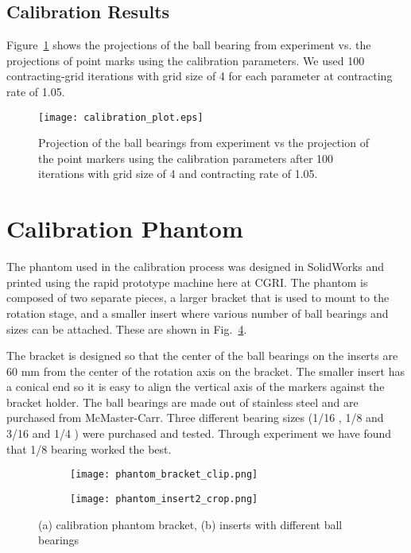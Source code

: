 \subsection{Calibration Results}
\label{subsect:cali_results}
Figure~\ref{fig:calibration_plot} shows the projections of the ball bearing from experiment vs. the projections of point marks using the calibration parameters.  We used 100 contracting-grid iterations with grid size of 4 for each parameter at contracting rate of 1.05.

\begin{figure}[h]
\texttt{[image: calibration\_plot.eps]}
\caption{Projection of the ball bearings from experiment vs the projection of the point markers using the calibration parameters after 100 iterations with grid size of 4 and contracting rate of 1.05.}
\label{fig:calibration_plot}
\end{figure}


\section{Calibration Phantom}
The phantom used in the calibration process was designed in SolidWorks and printed using the rapid prototype machine here at CGRI.  The phantom is composed of two separate pieces, a larger bracket that is used to mount to the rotation stage, and a smaller insert where various number of ball bearings and sizes can be attached.  These are shown in Fig.~\ref{fig:calibration_phantom}.

The bracket is designed so that the center of the ball bearings on the inserts are 60 mm from the center of the rotation axis on the bracket.  The smaller insert has a conical end so it is easy to align the vertical axis of the markers against the bracket holder.  The ball bearings are made out of stainless steel and are purchased from McMaster-Carr.  Three different bearing sizes (1/16 \inches, 1/8 \inches and 3/16 \inches and 1/4 \inches) were purchased and tested.  Through experiment we have found that 1/8 \inches bearing worked the best.
\begin{figure}[ht]
	\begin{subfigure}[b]{0.3\linewidth}
	\texttt{[image: phantom\_bracket\_clip.png]}
	\label{fig:calibration_phantom_bracket}
	\caption{}
	\end{subfigure}
\hspace{0.2cm}
	\begin{subfigure}[b]{0.3\linewidth}
	\texttt{[image: phantom\_insert2\_crop.png]}
	\label{fig:calibration_phantom_insert}
	\caption{}
	\end{subfigure}
\caption{(a) calibration phantom bracket, (b) inserts with different ball bearings}
\label{fig:calibration_phantom}
\end{figure}

